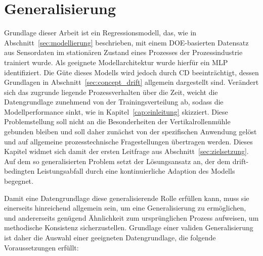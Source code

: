\chapter{Generalisierung} \label{cap:generalisierung}
%
Grundlage dieser Arbeit ist ein Regressionsmodell, das, wie in Abschnitt~\ref{sec:modellierung} beschrieben, mit einem \ac{DOE}-basierten Datensatz aus Sensordaten im stationären Zustand eines Prozesses der Prozessindustrie trainiert wurde. Als geeignete Modellarchitektur wurde hierfür ein \ac{MLP} identifiziert. Die Güte dieses Modells wird jedoch durch \ac{CD} beeinträchtigt, dessen Grundlagen in Abschnitt~\ref{sec:concept_drift} allgemein dargestellt sind. Verändert sich das zugrunde liegende Prozessverhalten über die Zeit, weicht die Datengrundlage zunehmend von der Trainingsverteilung ab, sodass die Modellperformance sinkt, wie in Kapitel~\ref{cap:einleitung} skizziert. Diese Problemstellung soll nicht an die Besonderheiten der Vertikalrollenmühle gebunden bleiben und soll daher zunächst von der spezifischen Anwendung gelöst und auf allgemeine prozesstechnische Fragestellungen übertragen werden. Dieses Kapitel widmet sich damit der ersten Leitfrage aus Abschnitt~\ref{sec:zielsetzung}. Auf dem so generalisierten Problem setzt der Lösungsansatz an, der dem drift-bedingten Leistungsabfall durch eine kontinuierliche Adaption des Modells begegnet. \par
Damit eine Datengrundlage diese generalisierende Rolle erfüllen kann, muss sie einerseits hinreichend allgemein sein, um eine Generalisierung zu ermöglichen, und andererseits genügend Ähnlichkeit zum ursprünglichen Prozess aufweisen, um methodische Konsistenz sicherzustellen. Grundlage einer validen Generalisierung ist daher die Auswahl einer geeigneten Datengrundlage, die folgende Voraussetzungen erfüllt:
%
